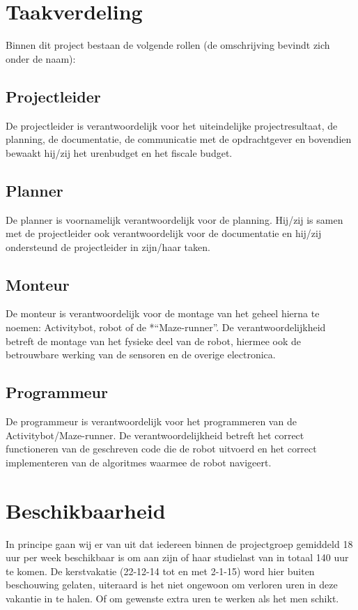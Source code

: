 \documentclass[oneside]{book}
\begin{document}
\section*{Taakverdeling}
Binnen dit project bestaan de volgende rollen (de omschrijving bevindt zich onder de naam):
\subsection*{Projectleider}
De projectleider is verantwoordelijk voor het uiteindelijke projectresultaat, de planning, de
documentatie, de communicatie met de opdrachtgever en bovendien bewaakt hij/zij het urenbudget
en het fiscale budget.
\subsection*{Planner}
De planner is voornamelijk verantwoordelijk voor de planning.
Hij/zij is samen met de projectleider ook verantwoordelijk voor de documentatie en hij/zij
ondersteund de projectleider in zijn/haar taken.
\subsection*{Monteur}
De monteur is verantwoordelijk voor de montage van het geheel hierna te noemen: Activitybot,
robot of de *“Maze-runner”.
De verantwoordelijkheid betreft de montage van het fysieke deel van de robot, hiermee ook de
betrouwbare werking van de sensoren en de overige electronica.
\subsection*{Programmeur}
De programmeur is verantwoordelijk voor het programmeren van de Activitybot/Maze-runner.
De verantwoordelijkheid betreft het correct functioneren van de geschreven code die de
robot uitvoerd en het correct implementeren van de algoritmes waarmee de robot navigeert.

\section*{Beschikbaarheid}
In principe gaan wij er van uit dat iedereen binnen de projectgroep gemiddeld 18 uur per week
beschikbaar is om aan zijn of haar studielast van in totaal 140 uur te komen.
De kerstvakatie (22-12-14 tot en met 2-1-15) word hier buiten beschouwing gelaten, uiteraard is het
niet ongewoon om verloren uren in deze vakantie in te halen.
Of om gewenste extra uren te werken als het men schikt.
\end{document}
